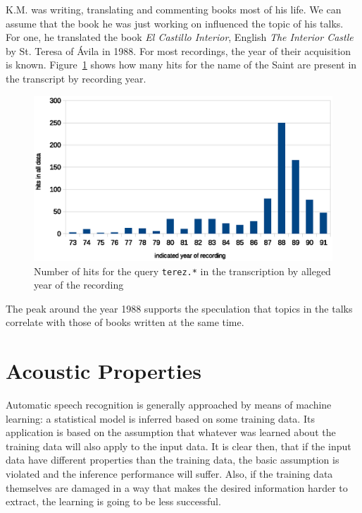 \documentclass[12pt,a4paper]{report}
\begin{document}
K.M. was writing, translating and commenting books most of his life. We can
assume that the book he was just working on influenced the topic of his talks. 
For one, he translated the book \emph{El Castillo Interior}, English \emph{The
Interior Castle} by St. Teresa of Ávila in 1988. For most recordings, the year
of their acquisition is known.  Figure~\ref{fig:teresa-year} shows how many hits
for the name of the Saint are present in the transcript by recording year.

\begin{figure}[htpb]
\includegraphics[scale=0.6]{rc/teresa-by-year.eps}
\caption{Number of hits for the query \texttt{terez.*} in the transcription by
alleged year of the recording}
\label{fig:teresa-year}
\end{figure}

The peak around the year 1988 supports the speculation that topics in the talks
correlate with those of books written at the same time.

\chapter{Acoustic Properties}
\label{chap:acoustics}

Automatic speech recognition is generally approached by means of machine
learning: a statistical model is inferred based on some training data. Its
application is based on the assumption that whatever was learned about the training
data will also apply to the input data. It is clear then, that if the input
data have different properties than the training data, the basic assumption is
violated and the inference performance will suffer.
Also, if the training data themselves are damaged in a way that makes the desired
information harder to extract, the learning is going to be less successful.
\end{document}
